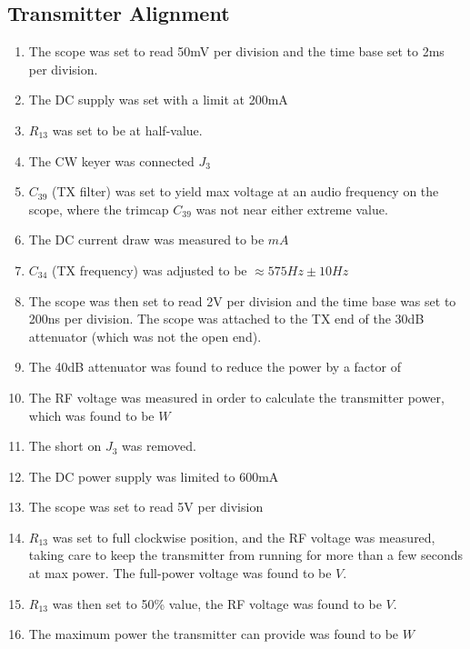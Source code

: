 \documentclass{./cls/hw}
\begin{document}
\subsection{Transmitter Alignment}
\begin{enumerate}
  \item The scope was set to read 50mV per division and the time base set to 2ms
    per division.
  \item The DC supply was set with a limit at 200mA
  \item $R_{13}$ was set to be at half-value.
  \item The CW keyer was connected $J_3$
  \item $C_{39}$ (TX filter) was set to yield max voltage at an audio frequency
    on the scope, where the trimcap $C_{39}$ was not near either extreme value.
  \item The DC current draw was measured to be $\boxed{ mA}$
  \item $C_{34}$ (TX frequency) was adjusted to be $\approx575Hz\pm10Hz$
  \item The scope was then set to read 2V per division and the time base was
    set to 200ns per division. The scope was attached to the TX end of the 30dB
    attenuator (which was not the open end).
  \item The 40dB attenuator was found to reduce the power by a factor of
    $\boxed{ }$
  \item The RF voltage was measured in order to calculate the transmitter
    power, which was found to be $\boxed{ W}$
  \item The short on $J_3$ was removed.
  \item The DC power supply was limited to 600mA
  \item The scope was set to read 5V per division
  \item $R_{13}$ was set to full clockwise position, and the RF voltage was
  measured, taking care to keep the transmitter from running for more than a
  few seconds at max power. The full-power voltage was found to be $\boxed{ V}$.
\item $R_{13}$ was then set to 50\% value, the RF voltage was found to be
  $\boxed{ V}$.
  \item The maximum power the transmitter can provide was found to be $\boxed{
    W}$
\end{enumerate}
\end{document}

